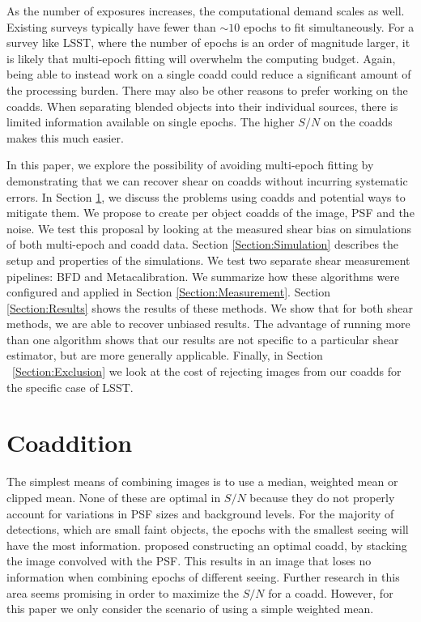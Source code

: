 \documentclass[fleqn,useAMS,usenatbib]{mnras}
\begin{document}
As the number of exposures increases, the computational demand scales as well.  Existing surveys typically have fewer than $\sim10$ epochs to fit simultaneously. For a survey like LSST, where the number of epochs is an order of magnitude larger, it is likely that multi-epoch fitting will overwhelm the computing budget.  Again, being able to instead work on a single coadd could reduce a significant amount of the processing burden.  There may also be other reasons to prefer working on the coadds.  When separating blended objects into their individual sources, there is limited information available on single epochs.  The higher $S/N$ on the coadds makes this much easier.  

In this paper, we explore the possibility of avoiding multi-epoch fitting by demonstrating that we can recover shear on coadds without incurring systematic errors.  In Section \ref{Section:Coaddition}, we discuss the problems using coadds and potential ways to mitigate them.  We propose to create per object coadds of the image, PSF and the noise.  We test this proposal by looking at the measured shear bias on simulations of both multi-epoch and coadd data.  Section \ref{Section:Simulation} describes the setup and properties of the simulations.  We test two separate shear measurement pipelines: BFD and Metacalibration.  We summarize how these algorithms were configured and applied in Section \ref{Section:Measurement}.  Section \ref{Section:Results} shows the results of these methods.  We show that for both shear methods, we are able to recover unbiased results.  The advantage of running more than one algorithm shows that our results are not specific to a particular shear estimator, but are more generally applicable.   Finally, in Section ~\ref{Section:Exclusion} we look at the cost of rejecting images from our coadds for the specific case of LSST.


\section{Coaddition}
\label{Section:Coaddition}

The simplest means of combining images is to use a median, weighted mean or clipped mean.  None of these are optimal in $S/N$ because they do not properly account for variations in PSF sizes and background levels.  For the majority of detections, which are small faint objects, the epochs with the smallest seeing will have the most information.  \cite{Kaiser2004,Zackay2017} proposed constructing an optimal coadd, by stacking the image convolved with the PSF.  This results in an image that loses no information when combining epochs of different seeing.  Further research in this area seems promising in order to maximize the $S/N$ for a coadd.  However, for this paper we only consider the scenario of using a simple weighted mean.  
\end{document}
